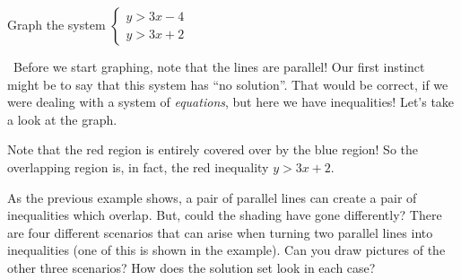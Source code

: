 \begin{boxedex}

 Graph the system $\left\{\begin{aligned} y>3x-4 \\ y>3x+2 \end{aligned}\right.$

\exsoln\ Before we start graphing, note that the lines are parallel! Our first instinct might be to say that this system has ``no solution''. That would be correct, if we were dealing with a system of \textit{equations}, but here we have inequalities! Let's take a look at the graph.

\begin{center}
\end{center}

Note that the red region is entirely covered over by the blue region! So the overlapping region is, in fact, the red inequality $y> 3x+2$.
\end{boxedex}

As the previous example shows, a pair of parallel lines can create a pair of inequalities which overlap. But, could the shading have gone differently? There are four different scenarios that can arise when turning two parallel lines into inequalities (one of this is shown in the example). Can you draw pictures of the other three scenarios? How does the solution set look in each case?

